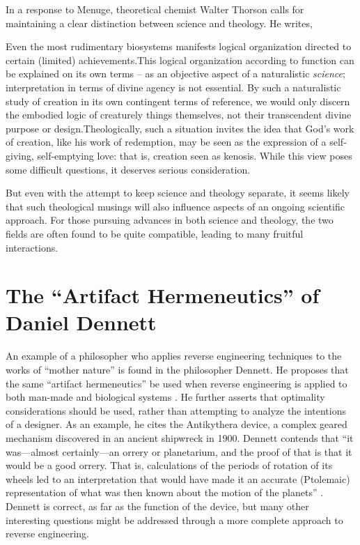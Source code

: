 In a response to Menuge, theoretical chemist Walter Thorson calls for
maintaining a clear distinction between science and theology. He
writes,

\begin{quoting}
Even the most rudimentary biosystems manifests logical
organization directed to certain (limited) achievements.{\jdots}This logical
organization according to function can be explained on its own terms –
as an objective aspect of a naturalistic \textit{science};
interpretation in terms of divine agency is not essential. By such a
naturalistic study of creation in its own contingent terms of
reference, we would only discern the embodied logic of creaturely
things themselves, not their transcendent divine purpose or
design.{\jdots}Theologically, such a situation invites the idea that God’s work
of creation, like his work of redemption, may be seen as the expression
of a self-giving, self-emptying love: that is, creation seen as
kenosis. While this view poses some difficult questions, it deserves
serious consideration. \citep[][p.~101]{thorson2003} 
\end{quoting}

But even with the attempt
to keep science and theology separate, it seems likely that such
theological musings will also influence aspects of an ongoing
scientific approach. For those pursuing advances in both science and
theology, the two fields are often found to be quite compatible,
leading to many fruitful interactions.

\section{The “Artifact Hermeneutics” of Daniel Dennett}

An example of a philosopher who applies reverse engineering
techniques to the works of “mother nature” is found in the
philosopher Dennett. He proposes that the same ``artifact hermeneutics'' be used
when reverse engineering is applied to both man-made and biological
systems \citep[][p.~177]{dennett1990}. He further asserts that optimality
considerations should be used, rather than attempting to analyze the
intentions of a designer. As an example, he cites the Antikythera
device, a complex geared mechanism discovered in an ancient shipwreck
in 1900. Dennett contends that “it was---almost certainly---an orrery
or planetarium, and the proof of that is that it would be a good
orrery. That is, calculations of the periods of rotation of its wheels
led to an interpretation that would have made it an accurate
(Ptolemaic) representation of what was then known about the motion of
the planets” \citep[][p.~180]{dennett1990}. Dennett is correct, as far as the
function of the device, but many other interesting questions might be
addressed through a more complete approach to reverse engineering.

